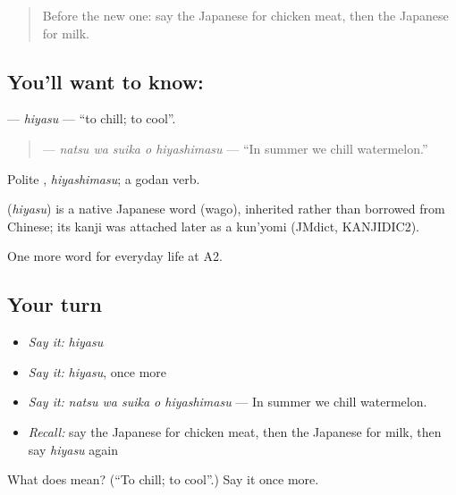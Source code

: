 \label{lesson:JA-C178-hiyasu}



\begin{quote}
Before the new one: say the Japanese for chicken meat, then the Japanese for milk.
\end{quote}

\subsection*{You'll want to know: }
\textbf{} — \emph{hiyasu} — \textquotedblleft{}to chill; to cool\textquotedblright{}.

\begin{quote}
\textbf{  } — \emph{natsu wa suika o hiyashimasu} — \textquotedblleft{}In summer we chill watermelon.\textquotedblright{}
\end{quote}

Polite \textbf{}, \emph{hiyashimasu}; a godan verb.

\begin{cousinweb}
\textbf{} (\emph{hiyasu}) is a native Japanese word (wago), inherited rather than borrowed from Chinese; its kanji was attached later as a kun'yomi (JMdict, KANJIDIC2).
\end{cousinweb}

\begin{grammarlens}[title={What you've built}]
One more word for everyday life at A2.
\end{grammarlens}

\subsection*{Your turn}
\begin{itemize}
\raggedright
  \item \emph{Say it:} \emph{hiyasu}
  \item \emph{Say it:} \emph{hiyasu}, once more
  \item \emph{Say it:} \emph{natsu wa suika o hiyashimasu} — In summer we chill watermelon.
  \item \emph{Recall:} say the Japanese for chicken meat, then the Japanese for milk, then say \emph{hiyasu} again
\end{itemize}

\begin{tcolorbox}[breakable,colback=teal!4,colframe=teal!35!black,title={Before you move on}]
What does  mean? (\textquotedblleft{}To chill; to cool\textquotedblright{}.) Say it once more.
\end{tcolorbox}

